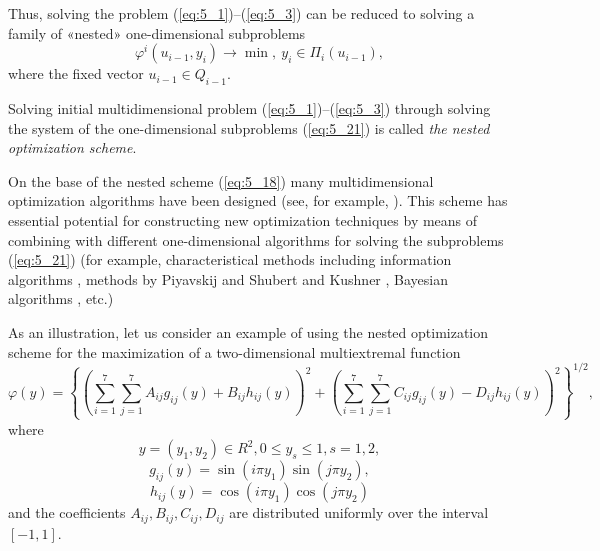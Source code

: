 Thus, solving the problem (\ref{eq:5_1})--(\ref{eq:5_3}) can be reduced to solving a family of «nested» one-dimensional subproblems 
\begin{equation}
\label{eq:5_21}
\varphi^i(u_{i-1},y_i)\rightarrow \min,\:y_i\in \Pi_i(u_{i-1}),
\end{equation}
where the fixed vector $u_{i-1}\in Q_{i-1}$.

Solving initial multidimensional problem (\ref{eq:5_1})--(\ref{eq:5_3})  through solving the system of the one-dimensional subproblems (\ref{eq:5_21}) is called \textit{the nested optimization scheme}.

On the base of the nested scheme (\ref{eq:5_18}) many multidimensional optimization algorithms have been designed (see, for example, \cite{5_CarrHowe, 5_Evtushenko, 5_GerGriIsr, 5_GriIsrAIP, 5_GriIsrCEUR, 5_GrishaginStrongin_EnginCybernetics, 5_Piyavskij, 5_SergGriJCAA, 5_ShiOlaf, 5_StrSergMon2000, 5_vanDam}). This scheme has essential potential for constructing new optimization techniques by means of combining with different one-dimensional algorithms for solving the subproblems (\ref{eq:5_21}) (for example, characteristical methods \cite{5_GrishaginSergeyevStrongin} including information    algorithms \cite{5_SergeyevLocTun, 5_Sergeyev1998, 5_SergeyevGrishaginOMS, 5_SergMukhKvasLera, 5_StrMonRus, 5_Str1973, 5_StrMarkin, 5_StrSergMon2000}, methods by Piyavskij and Shubert \cite{5_Piyavskij, 5_Shubert} and Kushner \cite{5_Kushner}, Bayesian algorithms \cite{5_Locatelli, 5_Mockus1980, 5_Mockus1988, 5_MockusEddy_et_al, 5_Zilinskas1975, 5_Zilinskas1981, 5_Zilinskas1985}, etc.) 

As an illustration, let us consider an example of using the nested optimization scheme for the maximization of a two-dimensional multiextremal function 
\begin{equation}
	\label{eq:5_GriFun}
	\varphi(y)=\left\{\left(\sum _{i=1}^7\sum _{j=1}^7A_{ij} g_{ij} (y)+B_{ij}h_{ij}(y) \right)^2 +\left(\sum _{i=1}^7\sum _{j=1}^7C_{ij}g_{ij}(y)-D_{ij}h_{ij}(y)\right)^2 \right\}^{1/2},
	\end{equation}
	where 
	\begin{equation*}
	y=(y_1 ,y_2 )\in R^2 ,0\le y_s \le 1,s=1,2,
	\end{equation*}
	\begin{equation*}
	g_{ij} (y)=\sin (i\pi y_1 )\sin (j\pi y_2 ),
	\end{equation*}
	\begin{equation*}
	h_{ij} (y)=\cos (i\pi y_1 )\cos (j\pi y_2 )
	\end{equation*}
	 and the coefficients $A_{ij} ,B_{ij} ,C_{ij} ,D_{ij} $ are distributed uniformly over the interval $[-1,1]$.   

